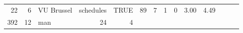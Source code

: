 \documentclass[]{svmono}
\theoremstyle{definition}
\theoremstyle{definition}
\theoremstyle{definition}
\theoremstyle{remark}
\begin{document}
\begin{longtable}[]{@{}rrlrrlllrrrrrr@{}}
\begin{minipage}[t]{0.02\columnwidth}
22\strut
\end{minipage} & \begin{minipage}[t]{0.03\columnwidth}\raggedleft\strut
6\strut
\end{minipage} & \begin{minipage}[t]{0.09\columnwidth}\raggedright\strut
VU Brussel\strut
\end{minipage} & \begin{minipage}[t]{0.14\columnwidth}\raggedright\strut
schedules\strut
\end{minipage} & \begin{minipage}[t]{0.04\columnwidth}\raggedright\strut
TRUE\strut
\end{minipage} & \begin{minipage}[t]{0.02\columnwidth}\raggedleft\strut
89\strut
\end{minipage} & \begin{minipage}[t]{0.03\columnwidth}\raggedleft\strut
7\strut
\end{minipage} & \begin{minipage}[t]{0.05\columnwidth}\raggedleft\strut
1\strut
\end{minipage} & \begin{minipage}[t]{0.06\columnwidth}\raggedleft\strut
0\strut
\end{minipage} & \begin{minipage}[t]{0.04\columnwidth}\raggedleft\strut
3.00\strut
\end{minipage} & \begin{minipage}[t]{0.03\columnwidth}\raggedleft\strut
4.49\strut
\end{minipage}\tabularnewline
\begin{minipage}[t]{0.02\columnwidth}\raggedleft\strut
392\strut
\end{minipage} & \begin{minipage}[t]{0.03\columnwidth}\raggedleft\strut
12\strut
\end{minipage} & \begin{minipage}[t]{0.03\columnwidth}\raggedright\strut
man\strut
\end{minipage} & \begin{minipage}[t]{0.02\columnwidth}\raggedleft\strut
24\strut
\end{minipage} & \begin{minipage}[t]{0.03\columnwidth}\raggedleft\strut
4\strut
\end{minipage} & \begin{minipage}[t]{0.09\columnwidth}\raggedright\strut

\end{minipage}
\end{longtable}
\end{document}
